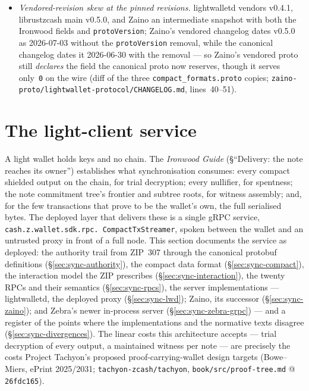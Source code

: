 \documentclass[11pt,a4paper]{article}
\theoremstyle{definition}
\begin{document}
\begin{itemize}
  says ``present if server can provide''; \textsf{lightwalletd} has a TODO,
  \textsf{Zaino} hardcodes zero (\S\ref{sec:sync-compact-wire}).
\item \emph{Vendored-revision skew at the pinned revisions.}
  \textsf{lightwalletd} vendors v0.4.1,
  \textsf{librustzcash} main v0.5.0, and \textsf{Zaino} an intermediate
  snapshot with both the Ironwood fields and \texttt{protoVersion};
  \textsf{Zaino}'s vendored changelog dates v0.5.0 as 2026-07-03 without
  the \texttt{protoVersion} removal, while the canonical changelog dates it
  2026-06-30 with the removal --- so \textsf{Zaino}'s vendored proto still
  \emph{declares} the field the canonical proto now reserves, though it
  serves only~\texttt{0} on the wire (diff of the three
  \texttt{compact\_formats.proto} copies;
  \texttt{zaino-proto/lightwallet-protocol/CHANGELOG.md}, lines~40--51).
\end{itemize}


\section{The light-client service}\label{sec:sync-service}

A light wallet holds keys and no chain. The \emph{Ironwood Guide}
(\S``Delivery: the note reaches its owner'') establishes what synchronisation
consumes: every compact
shielded output on the chain, for trial decryption; every nullifier, for
spentness; the note commitment tree's frontier and subtree roots, for
witness assembly; and, for the few transactions that prove to be the
wallet's own, the full serialised bytes. The deployed layer that delivers
these is a single gRPC service, \texttt{cash.z.wallet.sdk.rpc.\allowbreak
CompactTxStreamer}, spoken between the wallet and an untrusted proxy in
front of a full node. This section documents the service as deployed: the
authority trail from ZIP~307 through the canonical protobuf definitions
(\S\ref{sec:sync-authority}), the compact data format
(\S\ref{sec:sync-compact}), the interaction model the ZIP prescribes
(\S\ref{sec:sync-interaction}), the twenty RPCs and their semantics
(\S\ref{sec:sync-rpcs}), the server implementations --- lightwalletd,
the deployed proxy (\S\ref{sec:sync-lwd}); Zaino, its successor
(\S\ref{sec:sync-zaino}); and Zebra's newer in-process server
(\S\ref{sec:sync-zebra-grpc}) --- and a register of the points where the
implementations and the normative texts disagree
(\S\ref{sec:sync-divergences}). The linear costs this architecture accepts
--- trial decryption of every output, a maintained witness per note --- are
precisely the costs Project Tachyon's proposed proof-carrying-wallet design
targets (Bowe--Miers, ePrint 2025/2031;
\texttt{tachyon-zcash/tachyon}, \texttt{book/src/proof-tree.md} @
\texttt{26fdc165}).
\end{document}
